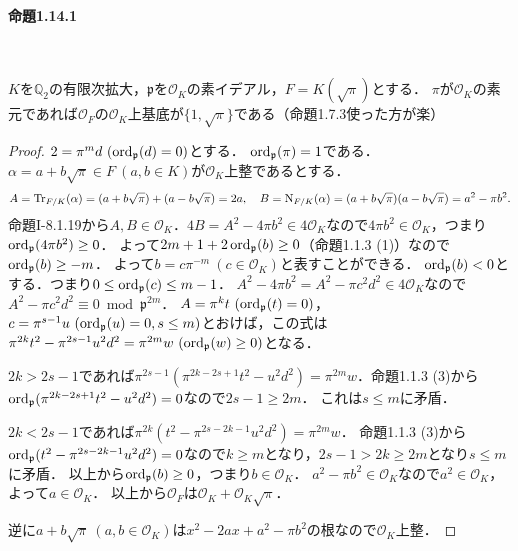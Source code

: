 \paragraph{命題1.14.1}~
\begin{screen}
  \begin{lem}\label{basis_Q2_prime_element}
    $K$を$\mathbb{Q}_2$の有限次拡大，$\mathfrak{p}$を$\mathcal{O}_K$の素イデアル，$F=K(\sqrt{\pi})$とする．
    $\pi$が$\mathcal{O}_K$の素元であれば$\mathcal{O}_F$の$\mathcal{O}_K$上基底が$\{1,\sqrt{\pi}\}$である（命題1.7.3使った方が楽）
  \end{lem}
\end{screen}
\begin{proof}
  $2=\pi^md\ (\ord_\mathfrak{p}(d)=0)$とする．
  $\operatorname{ord}_\mathfrak{p}(\pi)=1$である．
  $\alpha=a+b\sqrt{\pi}\in F\ (a,b\in K)$が$\mathcal{O}_K$上整であるとする．
  \[A=\operatorname{Tr}_{F/K}(\alpha)=(a+b\sqrt{\pi})+(a-b\sqrt{\pi})=2a,\quad B=\operatorname{N}_{F/K}(\alpha)=(a+b\sqrt{\pi})(a-b\sqrt{\pi})=a^2-\pi b^2.\]
  命題I-8.1.19から$A, B\in\mathcal{O}_K$．$4B=A^2-4\pi b^2\in 4\mathcal{O}_K$なので$4\pi b^2\in\mathcal{O}_K$，つまり$\operatorname{ord}_\mathfrak{p}(4\pi b^2)\geq 0$．
  よって$2m+1+2\operatorname{ord}_\mathfrak{p}(b)\geq 0$（命題1.1.3 (1)）なので$\operatorname{ord}_\mathfrak{p}(b)\geq -m$．
  よって$b=c\pi^{-m}\ (c\in\mathcal{O}_K)$と表すことができる．
  $\operatorname{ord}_\mathfrak{p}(b)< 0$とする．つまり$0\leq\operatorname{ord}_\mathfrak{p}(c)\leq m-1$．
  $A^2-4\pi b^2=A^2-\pi c^2d^2\in 4\mathcal{O}_K$なので$A^2-\pi c^2d^2\equiv 0\bmod\mathfrak{p}^{2m}$．
  $A=\pi^kt\ (\ord_\mathfrak{p}(t)=0)$，$c=\pi^{s-1}u\ (\operatorname{ord}_\mathfrak{p}(u)=0, s\leq m)$とおけば，この式は$\pi^{2k}t^2-\pi^{2s-1}u^2d^2=\pi^{2m}w\ (\ord_\mathfrak{p}(w)\geq0)$となる．

  $2k>2s-1$であれば$\pi^{2s-1}(\pi^{2k-2s+1}t^2-u^2d^2)=\pi^{2m}w$．命題1.1.3 (3)から$\operatorname{ord}_\mathfrak{p}(\pi^{2k-2s+1}t^2-u^2d^2)=0$なので$2s-1\geq 2m$．
  これは$s\leq m$に矛盾．

  $2k< 2s-1$であれば$\pi^{2k}(t^2-\pi^{2s-2k-1}u^2d^2)=\pi^{2m}w$．
  命題1.1.3 (3)から$\operatorname{ord}_\mathfrak{p}(t^2-\pi^{2s-2k-1}u^2d^2)=0$なので$k\geq m$となり，$2s-1>2k\geq2m$となり$s\leq m$に矛盾．
  以上から$\operatorname{ord}_\mathfrak{p}(b)\geq 0$，つまり$b\in\mathcal{O}_K$．
  $a^2-\pi b^2\in\mathcal{O}_K$なので$a^2\in\mathcal{O}_K$，よって$a\in\mathcal{O}_K$．
  以上から$\mathcal{O}_F$は$\mathcal{O}_K+\mathcal{O}_K\sqrt{\pi}$．

  逆に$a+b\sqrt{\pi}\ (a,b\in\mathcal{O}_K)$は$x^2-2ax+a^2-\pi b^2$の根なので$\mathcal{O}_K$上整．
\end{proof}

